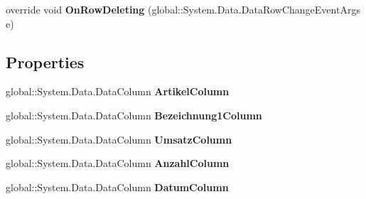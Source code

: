 \begin{DoxyCompactItemize}
\item 
override void {\bfseries On\+Row\+Deleting} (global\+::\+System.\+Data.\+Data\+Row\+Change\+Event\+Args e)\hypertarget{class_products_1_1_data_1_1ds_sage_1_1_product_sales_data_table_acdd7b32e8fd822a70a5203906b413c6e}{}\label{class_products_1_1_data_1_1ds_sage_1_1_product_sales_data_table_acdd7b32e8fd822a70a5203906b413c6e}

\end{DoxyCompactItemize}
\subsection*{Properties}
\begin{DoxyCompactItemize}
\item 
global\+::\+System.\+Data.\+Data\+Column {\bfseries Artikel\+Column}\hypertarget{class_products_1_1_data_1_1ds_sage_1_1_product_sales_data_table_ae675287cf4ffdd73a5c6d8ad84fe08b1}{}\label{class_products_1_1_data_1_1ds_sage_1_1_product_sales_data_table_ae675287cf4ffdd73a5c6d8ad84fe08b1}

\item 
global\+::\+System.\+Data.\+Data\+Column {\bfseries Bezeichnung1\+Column}\hypertarget{class_products_1_1_data_1_1ds_sage_1_1_product_sales_data_table_af085174f520ecfb1603b9d3e528b1db8}{}\label{class_products_1_1_data_1_1ds_sage_1_1_product_sales_data_table_af085174f520ecfb1603b9d3e528b1db8}

\item 
global\+::\+System.\+Data.\+Data\+Column {\bfseries Umsatz\+Column}\hypertarget{class_products_1_1_data_1_1ds_sage_1_1_product_sales_data_table_acc4ded053da125bd5bc925e9ce01afe6}{}\label{class_products_1_1_data_1_1ds_sage_1_1_product_sales_data_table_acc4ded053da125bd5bc925e9ce01afe6}

\item 
global\+::\+System.\+Data.\+Data\+Column {\bfseries Anzahl\+Column}\hypertarget{class_products_1_1_data_1_1ds_sage_1_1_product_sales_data_table_ac0300316a89529f9e071bf5457d33f50}{}\label{class_products_1_1_data_1_1ds_sage_1_1_product_sales_data_table_ac0300316a89529f9e071bf5457d33f50}

\item 
global\+::\+System.\+Data.\+Data\+Column {\bfseries Datum\+Column}\hypertarget{class_products_1_1_data_1_1ds_sage_1_1_product_sales_data_table_a795f12c157413196bc66e75e4e94aea3}{}\label{class_products_1_1_data_1_1ds_sage_1_1_product_sales_data_table_a795f12c157413196bc66e75e4e94aea3}


\end{DoxyCompactItemize}
